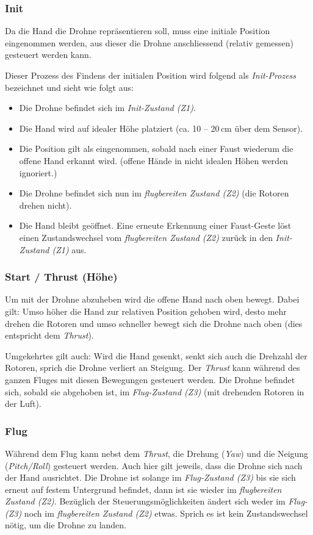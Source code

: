 \subsubsection{Init}
\label{sec:concept:init}
Da die Hand die Drohne repräsentieren soll, muss eine initiale Position eingenommen werden, aus dieser die Drohne anschliessend (relativ gemessen) gesteuert werden kann.

Dieser Prozess des Findens der initialen Position wird folgend als \textit{Init-Prozess} bezeichnet und sieht wie folgt aus:

\begin{itemize}
	\item Die Drohne befindet sich im \textit{Init-Zustand (Z1)}.
	\item Die Hand wird auf idealer Höhe platziert (ca. 10 -- 20\,cm über dem Sensor).
	\item Die Position gilt als eingenommen, sobald nach einer Faust wiederum die offene Hand erkannt wird. (offene Hände in nicht idealen Höhen werden ignoriert.)
	\item Die Drohne befindet sich nun im \textit{flugbereiten Zustand (Z2)} (die Rotoren drehen nicht).
	\item Die Hand bleibt geöffnet. Eine erneute Erkennung einer Faust-Geste löst einen Zustandswechsel vom \textit{flugbereiten Zustand (Z2)} zurück in den \textit{Init-Zustand (Z1)} aus.
\end{itemize}

\subsubsection{Start / Thrust (Höhe)}
Um mit der Drohne abzuheben wird die offene Hand nach oben bewegt.
Dabei gilt: Umso höher die Hand zur relativen Position gehoben wird, desto mehr drehen die Rotoren und umso schneller bewegt sich die Drohne nach oben (dies entspricht dem \textit{Thrust}).

Umgekehrtes gilt auch: Wird die Hand gesenkt, senkt sich auch die Drehzahl der Rotoren, sprich die Drohne verliert an Steigung.
Der \textit{Thrust} kann während des ganzen Fluges mit diesen Bewegungen gesteuert werden.
Die Drohne befindet sich, sobald sie abgehoben ist, im \textit{Flug-Zustand (Z3)} (mit drehenden Rotoren in der Luft).

\subsubsection{Flug}
Während dem Flug kann nebst dem \textit{Thrust}, die Drehung (\textit{Yaw}) und die Neigung (\textit{Pitch/Roll}) gesteuert werden.
Auch hier gilt jeweils, dass die Drohne sich nach der Hand ausrichtet.
Die Drohne ist solange im \textit{Flug-Zustand (Z3)} bis sie sich erneut auf festem Untergrund befindet, dann ist sie wieder im \textit{flugbereiten Zustand (Z2)}.
Bezüglich der Steuerungsmöglichkeiten ändert sich weder im \textit{Flug- (Z3)} noch im \textit{flugbereiten Zustand (Z2)} etwas.
Sprich es ist kein Zustandswechsel nötig, um die Drohne zu landen.

